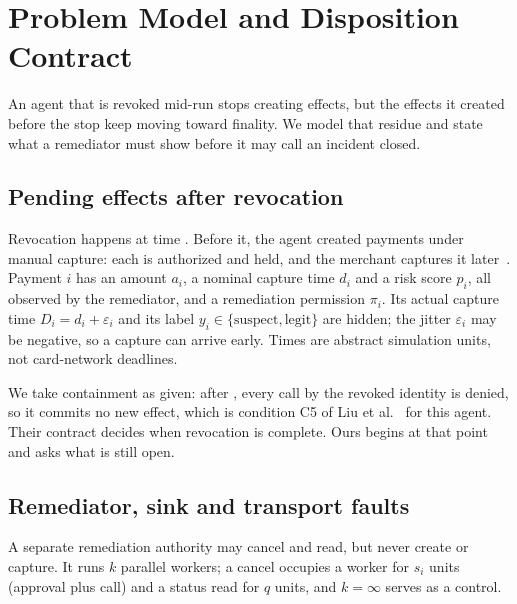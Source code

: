 \section{Problem Model and Disposition Contract}\label{sec:model}

An agent that is revoked mid-run stops creating effects, but the effects it created before the stop keep moving toward finality. We model that residue and state what a remediator must show before it may call an incident closed.

\subsection{Pending effects after revocation}\label{sec:model:effects}
Revocation happens at time . Before it, the agent created payments  under manual capture: each is authorized and held, and the merchant captures it later~\cite{stripe2026hold}. Payment $i$ has an amount $a_i$, a nominal capture time $d_i$ and a risk score $p_i$, all observed by the remediator, and a remediation permission $\pi_i$. Its actual capture time $D_i = d_i + \varepsilon_i$ and its label $y_i \in \{\text{suspect}, \text{legit}\}$ are hidden; the jitter $\varepsilon_i$ may be negative, so a capture can arrive early. Times are abstract simulation units, not card-network deadlines.

We take containment as given: after , every call by the revoked identity is denied, so it commits no new effect, which is condition C5 of Liu et al.~\cite{liu2026revocation} for this agent. Their contract decides when revocation is complete. Ours begins at that point and asks what is still open.

\subsection{Remediator, sink and transport faults}\label{sec:model:faults}
A separate remediation authority may cancel and read, but never create or capture. It runs $k$ parallel workers; a cancel occupies a worker for $s_i$ units (approval plus call) and a status read for $q$ units, and $k = \infty$ serves as a control.

